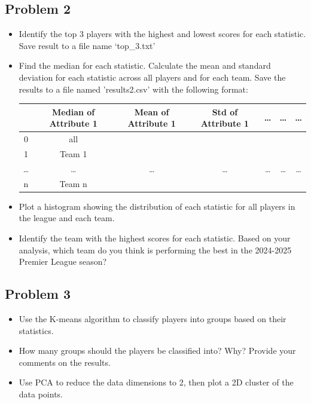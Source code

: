 \documentclass[12pt, letterpaper]{article}
\begin{document}
\subsection{Problem 2}
\begin{itemize}
    \item Identify the top 3 players with the highest and lowest scores for each statistic. Save result to a file name ‘top\_3.txt’
    \item Find the median for each statistic. Calculate the mean and standard deviation for each
statistic across all players and for each team. Save the results to a file named 'results2.csv'
with the following format:
    \begin{table}[H]
        \centering
        \begin{tabular}{|c|c|c|c|c|c|c|}
            \hline
              & Median of Attribute 1 & Mean of Attribute 1 & Std of Attribute 1 & \ldots & \ldots & \ldots \\
            \hline
            0 & all & & & & & \\
            \hline
            1 & Team 1 & & & & & \\
            \hline
            \ldots & \ldots & \ldots & \ldots & \ldots & \ldots & \ldots \\
            \hline
            n & Team n & & & & & \\
            \hline
        \end{tabular}
    \end{table}
    \item Plot a histogram showing the distribution of each statistic for all players in the league and each team.
    \item Identify the team with the highest scores for each statistic. Based on your analysis, which team do you think is performing the best in the 2024-2025 Premier League season?
\end{itemize}
\subsection{Problem 3}
\begin{itemize}
    \item Use the K-means algorithm to classify players into groups based on their statistics.
    \item How many groups should the players be classified into? Why? Provide your comments
    on the results.
    \item Use PCA to reduce the data dimensions to 2, then plot a 2D cluster of the data points.
\end{itemize}
\end{document}
